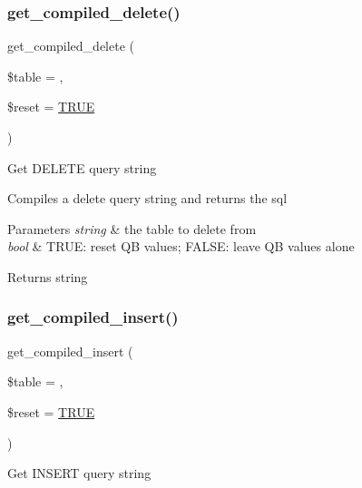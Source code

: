 \subsubsection{\texorpdfstring{get\+\_\+compiled\+\_\+delete()}{get\_compiled\_delete()}}
{\footnotesize\ttfamily get\+\_\+compiled\+\_\+delete (\begin{DoxyParamCaption}\item[{}]{\$table = {\ttfamily \textquotesingle{}\textquotesingle{}},  }\item[{}]{\$reset = {\ttfamily \mbox{\hyperlink{constants_8php_ae04a3efe6aa42044f803ee90c2277846}{T\+R\+UE}}} }\end{DoxyParamCaption})}

Get D\+E\+L\+E\+TE query string

Compiles a delete query string and returns the sql


\begin{DoxyParams}{Parameters}
{\em string} & the table to delete from \\
\hline
{\em bool} & T\+R\+UE\+: reset QB values; F\+A\+L\+SE\+: leave QB values alone \\
\hline
\end{DoxyParams}
\begin{DoxyReturn}{Returns}
string 
\end{DoxyReturn}
\mbox{\label{class_c_i___d_b__query__builder_a09abce3658cfaba8d8a148c91a9be0ea}} 
\subsubsection{\texorpdfstring{get\+\_\+compiled\+\_\+insert()}{get\_compiled\_insert()}}
{\footnotesize\ttfamily get\+\_\+compiled\+\_\+insert (\begin{DoxyParamCaption}\item[{}]{\$table = {\ttfamily \textquotesingle{}\textquotesingle{}},  }\item[{}]{\$reset = {\ttfamily \mbox{\hyperlink{constants_8php_ae04a3efe6aa42044f803ee90c2277846}{T\+R\+UE}}} }\end{DoxyParamCaption})}

Get I\+N\+S\+E\+RT query string

